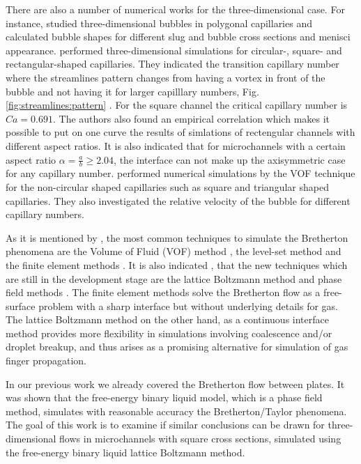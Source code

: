 \documentclass{article}
\begin{document}
There are also a number of numerical works for the three-dimensional case. For instance, 
\citet{wong-films,wong-pressure} studied
three-dimensional bubbles in
polygonal capillaries and calculated bubble shapes for different
slug and bubble cross sections and menisci appearance.
\citet{heil-threedim} performed three-dimensional simulations for circular-,
square- and rectangular-shaped capillaries. They indicated the transition
capillary number where the streamlines pattern
changes from having a vortex in front of the bubble and not having it for larger capilllary
numbers, {\color{red} Fig. \ref{fig:streamlines:pattern} }. For the square channel the critical
capillary number is $Ca=0.691$.  The authors also found an empirical correlation which
makes it possible to put on one curve the results of simlations of rectengular channels with different aspect ratios.
It is also indicated that for microchannels with a certain aspect ratio $\alpha=\frac{a}{b}\geq
2.04$, the interface can not make up the
axisymmetric case for any capillary number. \citet{wang-non-circular} performed numerical
simulations by the VOF technique for the
non-circular
shaped capillaries such as square and triangular shaped capillaries. They also investigated the relative
velocity of the bubble for
different capillary numbers. 

As it is mentioned by \citet{gupta-review}, the most common techniques to simulate the Bretherton
phenomena are the Volume of Fluid (VOF) method \cite{wang-non-circular}, the level-set method
\cite{fukugata-levelset} and the finite element methods \cite{kreutzer-taylor,heil-threedim}. It is
also indicated \cite{gupta-review}, that the new techniques which are still in the development stage
are the lattice Boltzmann method and phase field methods \cite{anderson-diffuse,gurtin-binary}.
The finite element methods solve the Bretherton flow as a free-surface problem with a sharp
interface but without underlying details for gas.  The lattice Boltzmann method on the other hand,
as a continuous interface method provides more flexibility in simulations involving coalescence and/or
droplet breakup, and thus arises as a promising alternative for simulation of gas finger propagation. 

In our previous work \cite{kuzmin-binary2d} we already covered the Bretherton flow between plates.
It was shown that the free-energy binary liquid model, which is a phase field method, simulates
with reasonable accuracy the Bretherton/Taylor phenomena. The goal of this work is to examine 
if similar conclusions can be drawn for three-dimensional flows in microchannels with square cross sections,
simulated using the free-energy binary liquid lattice Boltzmann
method.
\end{document}

